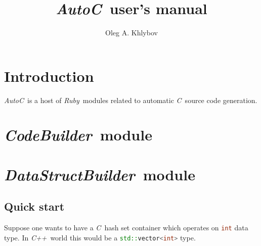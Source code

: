 \documentclass[a4paper]{article}
\newcommand{\autoc}{\emph{AutoC}}
\newcommand{\R}{\emph{Ruby}}
\newcommand{\C}{\emph{C}}
\newcommand{\Cpp}{\emph{C++}}
\begin{document}
\title{\autoc\ user's manual}
\author{Oleg A. Khlybov}


\maketitle


\section{Introduction}


\autoc\ is a host of \R\ modules related to automatic \C\ source code generation.


\newcommand{\codebuilder}{\emph{CodeBuilder}}
\section{\codebuilder\ module}


\newcommand{\datastructbuilder}{\emph{DataStructBuilder}}
\section{\datastructbuilder\ module}


\subsection{Quick start}


Suppose one wants to have a \C\ hash set container which operates on \lstinline[language=C++]{int} data type.
In \Cpp\ world this would be a \lstinline[language=C++]{std::vector<int>} type.
\end{document}
